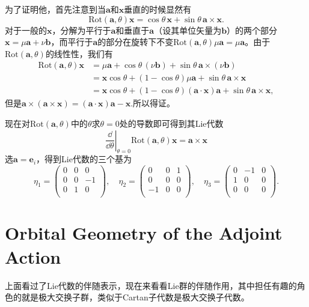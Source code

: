\documentclass[8pt]{book}
\theoremstyle{plain}
\begin{document}
为了证明他，首先注意到当$\mathbf{a}$和$\mathbf{x}$垂直的时候显然有
\[
\mathrm{Rot}(\mathbf{a},\theta)\mathbf{x}=\cos\theta\,\mathbf{x}+
\sin\theta\,\mathbf{a}\times\mathbf{x}.
\]
对于一般的$\mathbf{x}$，分解为平行于$\mathbf{a}$和垂直于$\mathbf{a}$（设其单位矢量为$\mathbf{b}$）的两个部分$\mathbf{x}=\mu\mathbf{a}+\nu\mathbf{b}$，而平行于$\mathbf{a}$的部分在旋转下不变$\mathrm{Rot}(\mathbf{a},\theta)\mu\mathbf{a}=\mu\mathbf{a}$。由于$\mathrm{Rot}(\mathbf{a},\theta)$的线性性，我们有
\[
\begin{split}
\mathrm{Rot}(\mathbf{a},\theta)\mathbf{x}&=\mu\mathbf{a}+\cos\theta\,(\nu\mathbf{b})+
\sin\theta\,\mathbf{a}\times(\nu\mathbf{b})\\
&=\mathbf{x}\cos\theta+(1-\cos\theta)\mu\mathbf{a}+
\sin\theta\,\mathbf{a}\times\mathbf{x}\\
&=\mathbf{x}\cos\theta+(1-\cos\theta)(\mathbf{a}\cdot\mathbf{x})\mathbf{a}+
\sin\theta\,\mathbf{a}\times \mathbf{x},
\end{split}
\]
但是$\mathbf{a}\times(\mathbf{a}\times\mathbf{x})=(\mathbf{a}\cdot\mathbf{x})\mathbf{a}-\mathbf{x}$.所以得证。

现在对$\mathrm{Rot}(\mathbf{a},\theta)$中的$\theta$求$\theta=0$处的导数即可得到其Lie代数
\[
\left.\frac{\dd}{\dd \theta}\right|_{\theta=0}\mathrm{Rot}(\mathbf{a},\theta)\mathbf{x}=\mathbf{a}\times\mathbf{x}
\]
选$\mathbf{a}=\mathbf{e}_i$，得到Lie代数的三个基为
\[
	\eta_1=
		\begin{pmatrix}
			0&0&0\\
			0&0&-1\\
			0&1&0\\
		\end{pmatrix},\quad
	\eta_2=
		\begin{pmatrix}
			0&0&1\\
			0&0&0\\
			-1&0&0\\
		\end{pmatrix},\quad
	\eta_3=
		\begin{pmatrix}
			0&-1&0\\
			1&0&0\\
			0&0&0\\
		\end{pmatrix}.
\]
\section{Orbital Geometry of the Adjoint Action}
上面看过了Lie代数的伴随表示，现在来看看Lie群的伴随作用，其中担任有趣的角色的就是极大交换子群，类似于Cartan子代数是极大交换子代数。
\end{document}
